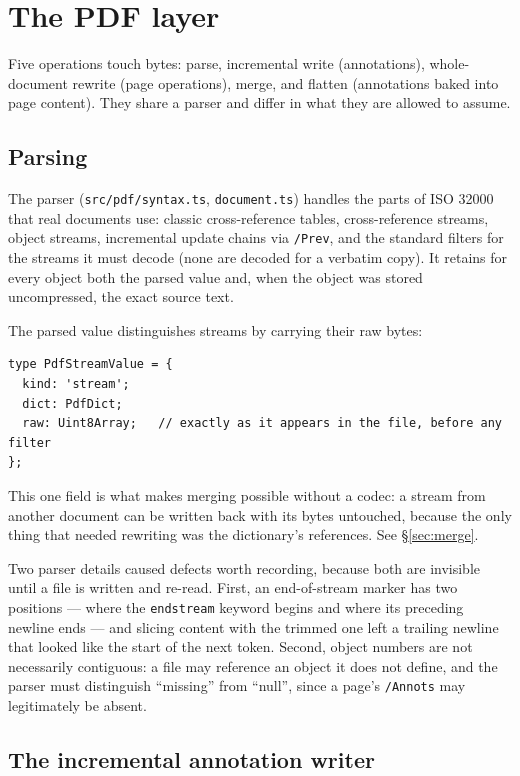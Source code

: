 \section{The PDF layer}
\label{sec:pdf-layer}

Five operations touch bytes: parse, incremental write (annotations), whole-document rewrite
(page operations), merge, and flatten (annotations baked into page content). They share a
parser and differ in what they are allowed to assume.

\subsection{Parsing}

The parser (\texttt{src/pdf/syntax.ts}, \texttt{document.ts}) handles the parts of ISO 32000
that real documents use: classic cross-reference tables, cross-reference streams, object
streams, incremental update chains via \texttt{/Prev}, and the standard filters for the
streams it must decode (none are decoded for a verbatim copy). It retains for every object
both the parsed value and, when the object was stored uncompressed, the exact source text.

The parsed value distinguishes streams by carrying their raw bytes:
\begin{lstlisting}[language={}]
type PdfStreamValue = {
  kind: 'stream';
  dict: PdfDict;
  raw: Uint8Array;   // exactly as it appears in the file, before any filter
};
\end{lstlisting}
This one field is what makes merging possible without a codec: a stream from another document
can be written back with its bytes untouched, because the only thing that needed rewriting
was the dictionary's references. See \S\ref{sec:merge}.

Two parser details caused defects worth recording, because both are invisible until a file is
written and re-read. First, an end-of-stream marker has two positions --- where the
\texttt{endstream} keyword begins and where its preceding newline ends --- and slicing content
with the trimmed one left a trailing newline that looked like the start of the next token.
Second, object numbers are not necessarily contiguous: a file may reference an object it does
not define, and the parser must distinguish ``missing'' from ``null'', since a page's
\texttt{/Annots} may legitimately be absent.

\subsection{The incremental annotation writer}
\label{sec:incremental}

